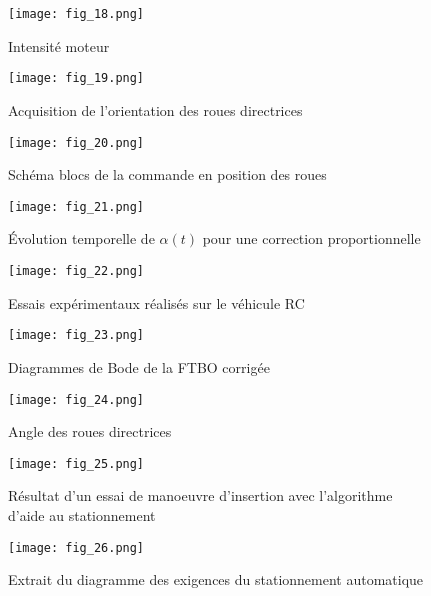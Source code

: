 \begin{figure}[H]
\centering
\texttt{[image: fig\_18.png]}
\caption{ Intensité moteur\label{fig_18}}
\end{figure}


\begin{figure}[H]
\centering
\texttt{[image: fig\_19.png]}
\caption{Acquisition de l’orientation des roues directrices \label{fig_19}}
\end{figure}


\begin{figure}[H]
\centering
\texttt{[image: fig\_20.png]}
\caption{Schéma blocs de la commande en position des roues \label{fig_20}}
\end{figure}


\begin{figure}[H]
\centering
\texttt{[image: fig\_21.png]}
\caption{Évolution temporelle de $\alpha(t)$ pour une correction proportionnelle \label{fig_21}}
\end{figure}


\begin{figure}[H]
\centering
\texttt{[image: fig\_22.png]}
\caption{Essais expérimentaux réalisés sur le véhicule RC \label{fig_22}}
\end{figure}


\begin{figure}[H]
\centering
\texttt{[image: fig\_23.png]}
\caption{Diagrammes de Bode de la FTBO corrigée \label{fig_23}}
\end{figure}


\begin{figure}[H]
\centering
\texttt{[image: fig\_24.png]}
\caption{Angle des roues directrices \label{fig_24}}
\end{figure}


\begin{figure}[H]
\centering
\texttt{[image: fig\_25.png]}
\caption{Résultat d’un essai de manoeuvre d’insertion avec l’algorithme d’aide au stationnement \label{fig_25}}
\end{figure}


\begin{figure}[H]
\centering
\texttt{[image: fig\_26.png]}
\caption{Extrait du diagramme des exigences du stationnement automatique \label{fig_26}}
\end{figure}


